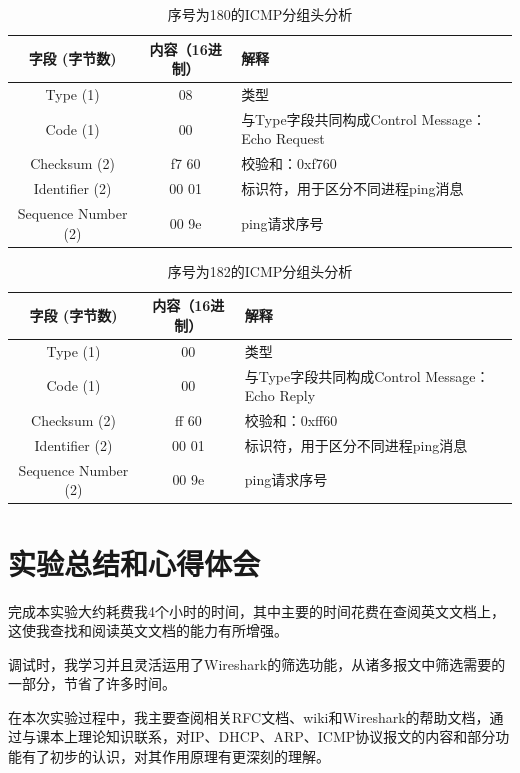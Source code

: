 \documentclass[lang=cn,11pt,a4paper,cite=authornum]{paper}
\begin{document}
\begin{table}[!htbp]
    \centering
    \caption{序号为180的ICMP分组头分析\label{tab:icmp5res}}
    \begin{tabular}{|c|c|l|}
        \hline
        字段 (字节数) & 内容（16进制） & 解释 \\
        \hline
        Type (1) & 08 & 类型 \\
        \hline
        Code (1) & 00 & 与Type字段共同构成Control Message：Echo Request \\
        \hline
        Checksum (2) & f7 60 & 校验和：0xf760 \\
        \hline
        Identifier (2) & 00 01 & 标识符，用于区分不同进程ping消息 \\
        \hline
        Sequence Number (2) & 00 9e & ping请求序号 \\
        \hline
    \end{tabular}
\end{table}

\begin{table}[!htbp]
    \centering
    \caption{序号为182的ICMP分组头分析\label{tab:icmp6res}}
    \begin{tabular}{|c|c|l|}
        \hline
        字段 (字节数) & 内容（16进制） & 解释 \\
        \hline
        Type (1) & 00 & 类型 \\
        \hline
        Code (1) & 00 & 与Type字段共同构成Control Message：Echo Reply \\
        \hline
        Checksum (2) & ff 60 & 校验和：0xff60 \\
        \hline
        Identifier (2) & 00 01 & 标识符，用于区分不同进程ping消息 \\
        \hline
        Sequence Number (2) & 00 9e & ping请求序号 \\
        \hline
    \end{tabular}
\end{table}

\section{实验总结和心得体会}

完成本实验大约耗费我4个小时的时间，其中主要的时间花费在查阅英文文档上，这使我查找和阅读英文文档的能力有所增强。

调试时，我学习并且灵活运用了Wireshark的筛选功能，从诸多报文中筛选需要的一部分，节省了许多时间。

在本次实验过程中，我主要查阅相关RFC文档、wiki和Wireshark的帮助文档，通过与课本上理论知识联系，对IP、DHCP、ARP、ICMP协议报文的内容和部分功能有了初步的认识，对其作用原理有更深刻的理解。
\end{document}
